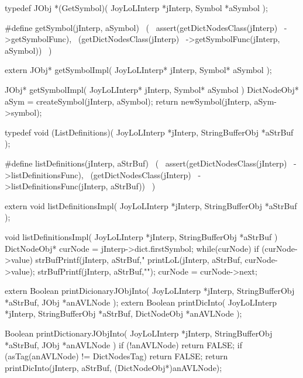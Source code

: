 \startCHeader
typedef JObj *(GetSymbol)(
  JoyLoLInterp *jInterp,
  Symbol       *aSymbol
);

#define getSymbol(jInterp, aSymbol)       \
  (                                       \
    assert(getDictNodesClass(jInterp)  \
      ->getSymbolFunc),                   \
    (getDictNodesClass(jInterp)        \
      ->getSymbolFunc(jInterp, aSymbol))  \
  )
\stopCHeader

\setCHeaderStream{private}
\startCHeader
extern JObj* getSymbolImpl(
  JoyLoLInterp* jInterp,
  Symbol* aSymbol
);
\stopCHeader
{}

\startCCode
JObj* getSymbolImpl(
  JoyLoLInterp* jInterp,
  Symbol* aSymbol
) {
  DictNodeObj* aSym = createSymbol(jInterp, aSymbol);
  return newSymbol(jInterp, aSym->symbol);
}
\stopCCode

\startCHeader
typedef void (ListDefinitions)(
  JoyLoLInterp    *jInterp,
  StringBufferObj *aStrBuf
);

#define listDefinitions(jInterp, aStrBuf)       \
  (                                             \
    assert(getDictNodesClass(jInterp)        \
      ->listDefinitionsFunc),                   \
    (getDictNodesClass(jInterp)              \
      ->listDefinitionsFunc(jInterp, aStrBuf))  \
  )
\stopCHeader

\setCHeaderStream{private}
\startCHeader
extern void listDefinitionsImpl(
  JoyLoLInterp    *jInterp,
  StringBufferObj *aStrBuf
);
\stopCHeader
\setCHeaderStream{public}

\startCCode
void listDefinitionsImpl(
  JoyLoLInterp    *jInterp,
  StringBufferObj *aStrBuf
) {
  DictNodeObj* curNode = jInterp->dict.firstSymbol;
  while(curNode) {
    if (curNode->value) {
      strBufPrintf(jInterp, aStrBuf,"%
      printLoL(jInterp, aStrBuf, curNode->value);
      strBufPrintf(jInterp, aStrBuf,"\n");
    }
    curNode = curNode->next;
  }
}
\stopCCode

\setCHeaderStream{private}
\startCHeader
extern Boolean printDicionaryJObjInto(
  JoyLoLInterp    *jInterp,
  StringBufferObj *aStrBuf,
  JObj        *anAVLNode
);
extern Boolean printDicInto(
  JoyLoLInterp    *jInterp,
  StringBufferObj *aStrBuf,
  DictNodeObj         *anAVLNode
);
\stopCHeader
{}

\startCCode
Boolean printDictionaryJObjInto(
  JoyLoLInterp    *jInterp,
  StringBufferObj *aStrBuf,
  JObj        *anAVLNode
) {
  if (!anAVLNode) return FALSE;
  if (asTag(anAVLNode) != DictNodesTag) return FALSE;
  return printDicInto(jInterp, aStrBuf, (DictNodeObj*)anAVLNode);
}

